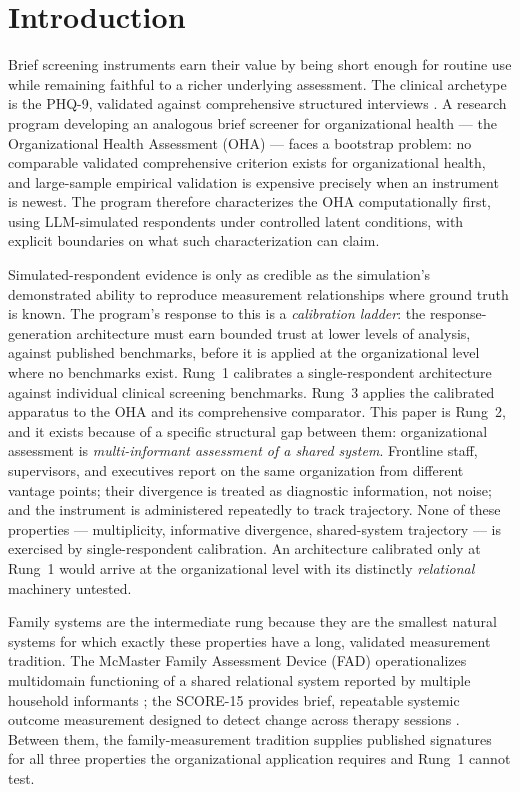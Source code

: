 \documentclass[12pt, letterpaper]{article}
\begin{document}
\section{Introduction}
\label{sec:intro}

Brief screening instruments earn their value by being short enough for routine use while remaining faithful to a richer underlying assessment. The clinical archetype is the PHQ-9, validated against comprehensive structured interviews \parencite{kroenke2001}. A research program developing an analogous brief screener for organizational health --- the Organizational Health Assessment (OHA) \parencite{carr2025} --- faces a bootstrap problem: no comparable validated comprehensive criterion exists for organizational health, and large-sample empirical validation is expensive precisely when an instrument is newest. The program therefore characterizes the OHA computationally first, using LLM-simulated respondents under controlled latent conditions, with explicit boundaries on what such characterization can claim.

Simulated-respondent evidence is only as credible as the simulation's demonstrated ability to reproduce measurement relationships where ground truth is known. The program's response to this is a \emph{calibration ladder}: the response-generation architecture must earn bounded trust at lower levels of analysis, against published benchmarks, before it is applied at the organizational level where no benchmarks exist. Rung~1 calibrates a single-respondent architecture against individual clinical screening benchmarks. Rung~3 applies the calibrated apparatus to the OHA and its comprehensive comparator. This paper is Rung~2, and it exists because of a specific structural gap between them: organizational assessment is \emph{multi-informant assessment of a shared system}. Frontline staff, supervisors, and executives report on the same organization from different vantage points; their divergence is treated as diagnostic information, not noise; and the instrument is administered repeatedly to track trajectory. None of these properties --- multiplicity, informative divergence, shared-system trajectory --- is exercised by single-respondent calibration. An architecture calibrated only at Rung~1 would arrive at the organizational level with its distinctly \emph{relational} machinery untested.

Family systems are the intermediate rung because they are the smallest natural systems for which exactly these properties have a long, validated measurement tradition. The McMaster Family Assessment Device (FAD) operationalizes multidomain functioning of a shared relational system reported by multiple household informants \parencite{epstein1983}; the SCORE-15 provides brief, repeatable systemic outcome measurement designed to detect change across therapy sessions \parencite{stratton2014}. Between them, the family-measurement tradition supplies published signatures for all three properties the organizational application requires and Rung~1 cannot test.
\end{document}
